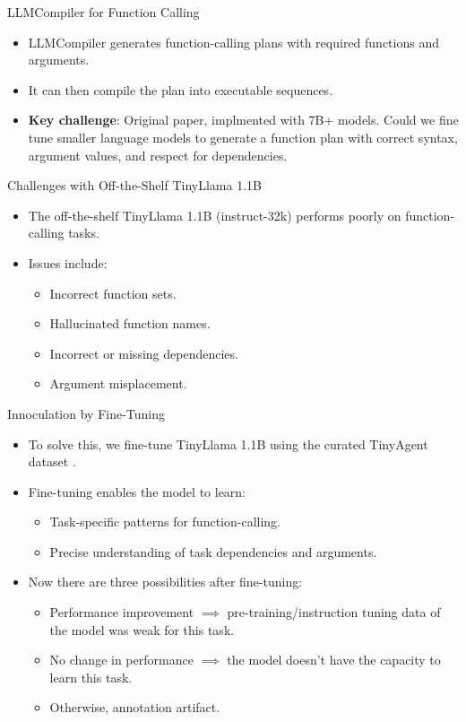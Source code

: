 \documentclass{beamer}
\begin{document}
\begin{frame}{LLMCompiler for Function Calling}
    \begin{itemize}
        \item LLMCompiler \citep{kim2023llmcompiler} generates function-calling plans with required functions and arguments.
        \item It can then compile the plan into executable sequences.
        \item \textbf{Key challenge}: Original paper, implmented with 7B+ models. Could we fine tune smaller language models to generate a function plan with correct syntax, argument values, and respect for dependencies.
    \end{itemize}
\end{frame}

\begin{frame}{Challenges with Off-the-Shelf TinyLlama 1.1B}
    \begin{itemize}
        \item The off-the-shelf TinyLlama 1.1B (instruct-32k) performs poorly on function-calling tasks.
        \item Issues include:
        \begin{itemize}
            \item Incorrect function sets.
            \item Hallucinated function names.
            \item Incorrect or missing dependencies.
            \item Argument misplacement.
        \end{itemize}
    \end{itemize}
\end{frame}

\begin{frame}{Innoculation by Fine-Tuning}
    \begin{itemize}
        \item To solve this, we fine-tune TinyLlama 1.1B using the curated TinyAgent dataset \citep{erdogan2024tinyagent}.
        \item Fine-tuning enables the model to learn:
        \begin{itemize}
            \item Task-specific patterns for function-calling.
            \item Precise understanding of task dependencies and arguments.
        \end{itemize}
        \item Now there are three possibilities after fine-tuning:
        \begin{itemize}
            \item Performance improvement \(\implies \) pre-training/instruction tuning data of the model was weak for this task.
            \item No change in performance \(\implies \) the model doesn't have the capacity to learn this task.
            \item Otherwise, annotation artifact.
        \end{itemize}
    \end{itemize}
\end{frame}
\end{document}
